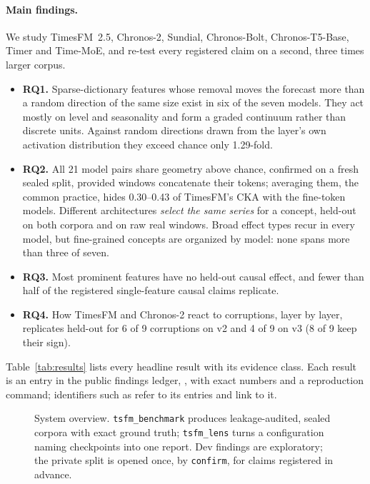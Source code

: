 \paragraph{Main findings.} We study TimesFM~2.5, Chronos-2, Sundial, Chronos-Bolt, Chronos-T5-Base, Timer and Time-MoE,
and re-test every registered claim on a second, three times larger corpus.
\begin{itemize}
  \item \textbf{RQ1.} Sparse-dictionary features whose removal moves the forecast more than a random direction of the
    same size exist in six of the seven models. They act mostly on level and seasonality and form a graded continuum
    rather than discrete units. Against random directions drawn from the layer's own activation distribution they
    exceed chance only 1.29-fold.
  \item \textbf{RQ2.} All 21 model pairs share geometry above chance, confirmed on a fresh sealed split, provided
    windows concatenate their tokens; averaging them, the common practice, hides 0.30--0.43 of TimesFM's CKA with the
    fine-token models. Different architectures \emph{select the same series} for a concept, held-out on both corpora and
    on raw real windows. Broad effect types recur in every model, but fine-grained concepts are organized by model: none
    spans more than three of seven.
  \item \textbf{RQ3.} Most prominent features have no held-out causal effect, and fewer than half of the registered
    single-feature causal claims replicate.
  \item \textbf{RQ4.} How TimesFM and Chronos-2 react to corruptions, layer by layer, replicates held-out for 6 of 9
    corruptions on v2 and 4 of 9 on v3 (8 of 9 keep their sign).
\end{itemize}
Table~\ref{tab:results} lists every headline result with its evidence class. Each result is an entry in the public
findings ledger, , with exact numbers and a reproduction command; identifiers such as 
refer to its entries and link to it.

\begin{figure}[!tb]
\centering

\caption{System overview. \texttt{tsfm\_benchmark} produces leakage-audited, sealed corpora with exact
ground truth; \texttt{tsfm\_lens} turns a configuration naming checkpoints into one report. Dev findings
are exploratory; the private split is opened once, by \texttt{confirm}, for claims registered in advance.}
\label{fig:overview}
\end{figure}
